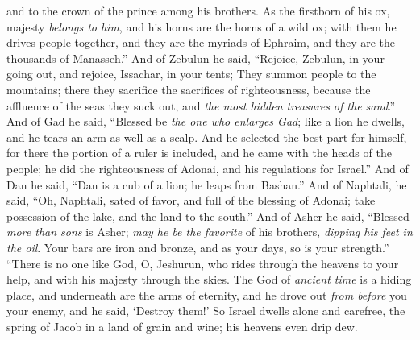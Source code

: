 \begin{biblechapter}
and to the crown of the prince among his brothers.
\verse As the firstborn of his ox, majesty \textit{belongs to him}, 
and his horns are the horns of a wild ox; 
with them he drives people together, 
and they are the myriads of Ephraim, 
and they are the thousands of Manasseh.”
\verse And of Zebulun he said, 
“Rejoice, Zebulun, in your going out, 
and rejoice, Issachar, in your tents;
\verse They summon people to the mountains; 
there they sacrifice the sacrifices of righteousness, 
because the affluence of the seas they suck out, 
and \textit{the most hidden treasures of the sand}.”
\verse And of Gad he said, 
“Blessed be \textit{the one who enlarges Gad}; 
like a lion he dwells, 
and he tears an arm as well as a scalp.
\verse And he selected the best part for himself,  
for there the portion of a ruler is included, 
and he came with the heads of the people; 
he did the righteousness of Adonai, 
and his regulations for Israel.”
\verse And of Dan he said, 
“Dan is a cub of a lion; 
he leaps from Bashan.”
\verse And of Naphtali, he said, 
“Oh, Naphtali, sated of favor, 
and full of the blessing of Adonai; 
take possession of the lake, 
and the land to the south.”
\verse And of Asher he said, 
“Blessed \textit{more than sons} is Asher; 
\textit{may he be the favorite} of his brothers, 
\textit{dipping his feet in the oil}.
\verse Your bars are iron and bronze, 
and as your days, so is your strength.”
\verse “There is no one like God, O, Jeshurun, 
who rides through the heavens to your help, 
and with his majesty through the skies.
\verse The God of \textit{ancient time} is a hiding place, 
and underneath are the arms of eternity, 
and he drove out \textit{from before} you your enemy, 
and he said, ‘Destroy them!’
\verse So Israel dwells alone and carefree, 
the spring of Jacob in a land of grain and wine; 
his heavens even drip dew.
\end{biblechapter}

